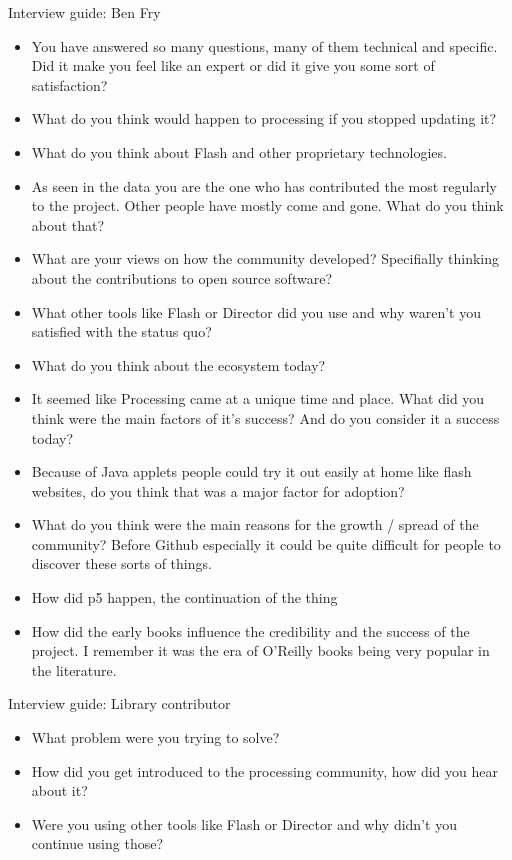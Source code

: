 Interview guide: Ben Fry
\begin{itemize}
    \item You have answered so many questions, many of them technical and specific. Did it make you feel like an expert or did it give you some sort of satisfaction?
    \item What do you think would happen to processing if you stopped updating it?
    \item What do you think about Flash and other proprietary technologies.
    \item As seen in the data you are the one who has contributed the most regularly to the project. Other people have mostly come and gone. What do you think about that?
    \item What are your views on how the community developed? Specifially thinking about the contributions to open source software?
    \item What other tools like Flash or Director did you use and why waren't you satisfied with the status quo?
    \item What do you think about the ecosystem today?
    \item It seemed like Processing came at a unique time and place. What did you think were the main factors of it's success? And do you consider it a success today?
    \item Because of Java applets people could try it out easily at home like flash websites, do you think that was a major factor for adoption?
    \item What do you think were the main reasons for the growth / spread of the community? Before Github especially it could be quite difficult for people to discover these sorts of things.
    \item How did p5 happen, the continuation of the thing
    \item How did the early books influence the credibility and the success of the project. I remember it was the era of O'Reilly books being very popular in the literature.
\end{itemize}

Interview guide: Library contributor
\begin{itemize}
    \item What problem were you trying to solve?
    \item How did you get introduced to the processing community, how did you hear about it?
    \item Were you using other tools like Flash or Director and why didn't you continue using those?
\end{itemize}